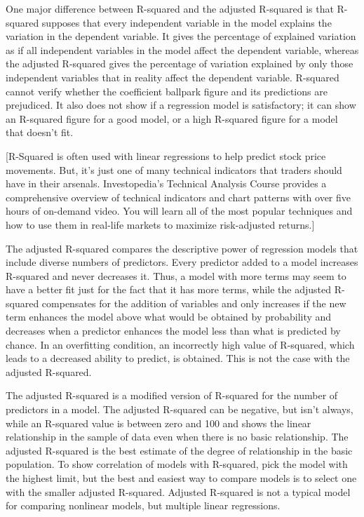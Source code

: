 One major difference between R-squared and the adjusted R-squared is that R-squared supposes that every independent variable in the model explains the variation in the dependent variable. It gives the percentage of explained variation as if all independent variables in the model affect the dependent variable, whereas the adjusted R-squared gives the percentage of variation explained by only those independent variables that in reality affect the dependent variable. R-squared cannot verify whether the coefficient ballpark figure and its predictions are prejudiced. It also does not show if a regression model is satisfactory; it can show an R-squared figure for a good model, or a high R-squared figure for a model that doesn’t fit.

[R-Squared is often used with linear regressions to help predict stock price movements. But, it's just one of many technical indicators that traders should have in their arsenals. Investopedia's Technical Analysis Course provides a comprehensive overview of technical indicators and chart patterns with over five hours of on-demand video. You will learn all of the most popular techniques and how to use them in real-life markets to maximize risk-adjusted returns.]

The adjusted R-squared compares the descriptive power of regression models that include diverse numbers of predictors. Every predictor added to a model increases R-squared and never decreases it. Thus, a model with more terms may seem to have a better fit just for the fact that it has more terms, while the adjusted R-squared compensates for the addition of variables and only increases if the new term enhances the model above what would be obtained by probability and decreases when a predictor enhances the model less than what is predicted by chance. In an overfitting condition, an incorrectly high value of R-squared, which leads to a decreased ability to predict, is obtained. This is not the case with the adjusted R-squared.

The adjusted R-squared is a modified version of R-squared for the number of predictors in a model. The adjusted R-squared can be negative, but isn't always, while an R-squared value is between zero and 100 and shows the linear relationship in the sample of data even when there is no basic relationship. The adjusted R-squared is the best estimate of the degree of relationship in the basic population. To show correlation of models with R-squared, pick the model with the highest limit, but the best and easiest way to compare models is to select one with the smaller adjusted R-squared. Adjusted R-squared is not a typical model for comparing nonlinear models, but multiple linear regressions.



